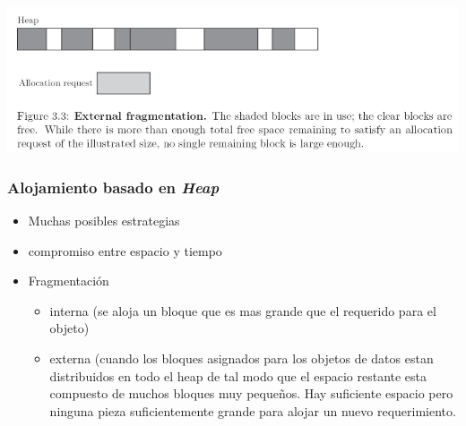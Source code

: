\documentclass[11pt]{article}
\begin{document}
\begin{center}
\includegraphics[width=.9\linewidth]{alojdinheap.png}
\end{center}

\subsubsection*{Alojamiento basado en \emph{Heap}}
\label{sec:orgc762b44}
\begin{itemize}
\item Muchas posibles estrategias
\item compromiso entre espacio y tiempo
\item Fragmentación
\begin{itemize}
\item interna (se aloja un bloque que es mas grande que el requerido
para el objeto)
\item externa (cuando los bloques asignados para los objetos de datos
estan distribuidos en todo el heap de tal modo que el espacio
restante esta compuesto de muchos bloques muy pequeños. Hay
suficiente espacio pero ninguna pieza suficientemente grande para
alojar un nuevo requerimiento.
\end{itemize}
\end{itemize}
\end{document}
